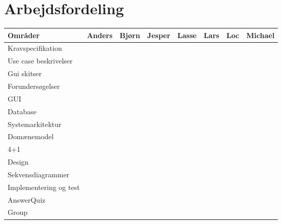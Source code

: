 \chapter*{Arbejdsfordeling}




\begin{tabular}{|l|c|c|c|c|c|c|c|}
\hline 
\rowcolor{Gray}
\textbf{Områder} 			& Anders 		& Bjørn 	& Jesper 		& Lasse 	& Lars 		& Loc 		& Michael \\ 
\hline

Kravspecifikation 		&\checkmark &\checkmark	&\checkmark	&\checkmark	&\checkmark	&\checkmark	&\checkmark \\ 
\hline

Use case beskrivelser 		&\checkmark &\checkmark	&\checkmark	&\checkmark	&\checkmark	&\checkmark	&\checkmark \\ 
\hline

Gui skitser 		&\checkmark &	&\checkmark	&\checkmark	&\checkmark	&	&	\\ 
\hline

\rowcolor{Gray}
Forundersøgelser 		&\multicolumn{7}{c|}{ } \\ 
\hline
GUI 		& &\checkmark	&	&	&	&	&	\\ 
\hline

Database 		& &	&	&	&	&	&	\checkmark\\ 
\hline

\rowcolor{Gray}
Systemarkitektur 		&\multicolumn{7}{c|}{ } \\ 
\hline
Domænemodel		&	&	&	&	& 	&\checkmark	&	 \\ 
\hline

4+1		&	&\checkmark	&\checkmark	&\checkmark	&\checkmark 	&	&	 \\ 
\hline

\rowcolor{Gray}
Design 		&\multicolumn{7}{c|}{ } \\ 
\hline
Sekvensdiagrammer		&	&\checkmark	&	&	& 	&	&\checkmark	 \\ 
\hline

\rowcolor{Gray}
Implementering og test 		&\multicolumn{7}{c|}{ } \\ 
\hline

AnswerQuiz		&\checkmark	&\checkmark	&	&\checkmark	& 	&	&	 \\ 
\hline

Group		&	&	&\checkmark	&	& 	&	& \\ 
\hline


\end{tabular}
